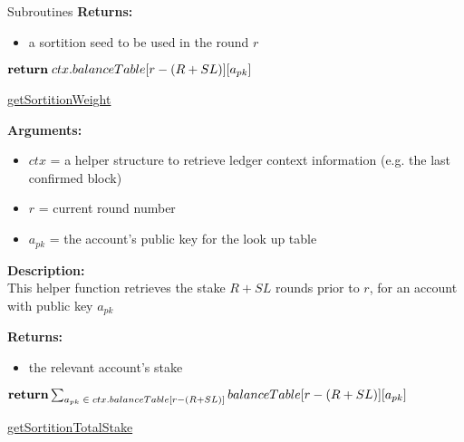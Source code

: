 \documentclass[10pt,a4paper]{article}
\begin{document}
\begin{section}{Subroutines}
\noindent \textbf{Returns:}
\begin{itemize}
    \item a sortition seed to be used in the round $r$
  \end{itemize}


\begin{algorithm}[H]
    \begin{algorithmic}[1]

            $\Return\;ctx.balanceTable[r - (R + SL)][a_{pk}]$

        \EndFunction
    \end{algorithmic}
    \caption{\underline{getSortitionWeight}}
\end{algorithm}

\noindent \textbf{Arguments:}
\begin{itemize}
    \item $ctx$ = a helper structure to retrieve ledger context information (e.g. the last confirmed block)
    \item $r$ = current round number
    \item $a_{pk}$ = the account's public key for the look up table
  \end{itemize}


\noindent \textbf{Description:}\\
This helper function retrieves the stake $R + SL$ rounds prior to $r$, for an account
with public key $a_{pk}$

\noindent \textbf{Returns:}
\begin{itemize}
    \item the relevant account's stake
  \end{itemize}




\begin{algorithm}[H]
    \begin{algorithmic}[1]
        
        $\Return \sum_{a_{pk}\;\in\;ctx.balanceTable[r - (R + SL)]}{balanceTable[r - (R + SL)][a_{pk}]}$

        \EndFunction
    \end{algorithmic}
    \caption{\underline{getSortitionTotalStake}}
\end{algorithm}


\end{section}
\end{document}
